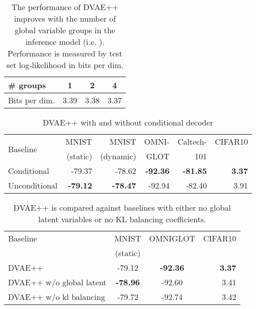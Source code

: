 \documentclass{article}
\begin{document}
\begin{table}
\centering
  \caption{The performance of DVAE++ improves with the number of global variable groups in the inference model 
  (i.e. ). Performance is measured by test set log-likelihood in bits per dim.}
\begin{tabular}{ l|c|c|c}    \# groups           & 1     & 2      & 4    \\
\hline
Bits per dim.       & 3.39 & 3.38  & 3.37 \\
\end{tabular} \label{tab:num_layer_global}
\end{table}

\setlength{\tabcolsep}{2pt}
\begin{table}
\caption{DVAE++ with and without conditional decoder} \label{tab:ab_cond}
\small
\centering
\begin{tabular}{l r r r r r}
\multirow{2}{*}{Baseline}  & MNIST & MNIST & OMNI- & Caltech- & CIFAR10 \\
  & (static) & (dynamic) & GLOT  & 101 &  \\
\hline
Conditional   & -79.37 & -78.62 & \textbf{-92.36} & \textbf{-81.85} & \textbf{3.37} \\
\hline
Unconditional & \textbf{-79.12} & \textbf{-78.47} & -92.94 & -82.40 & 3.91 \\
\hline
\end{tabular}
\end{table}

\begin{table}
\caption{DVAE++ is compared against baselines with either 
no global latent variables or no KL balancing coefficients.} \label{tab:ab_gl_kl}
\small
\centering
\begin{tabular}{l c c r}
Baseline  & MNIST & OMNIGLOT & CIFAR10 \\
  & (static) & & \\
\hline
DVAE++                   & -79.12 & \textbf{-92.36} & \textbf{3.37}\\
\hline
DVAE++ w/o global latent & \textbf{-78.96} & -92.60 & 3.41 \\
\hline
DVAE++ w/o kl balancing  & -79.72 & -92.74 &  3.42 \\
\hline
\end{tabular}
\end{table}
\end{document}
